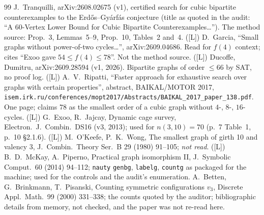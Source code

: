 \documentclass[10pt]{article}
\newcommand{\tier}[1]{\textsf{[#1]}}
\newcommand{\tL}{\tier{L}}
\begin{document}
\begin{thebibliography}{99}\small
{} J.\ Tranquilli, arXiv:2608.02675 (v1), certified search for cubic bipartite counterexamples to the Erd\H{o}s--Gy\'arf\'as conjecture (title as quoted in the audit: ``A 60-Vertex Lower Bound for Cubic Bipartite Counterexamples\dots''). The method source: Prop.~3, Lemmas~5--9, Prop.~10, Tables~2 and~4. (\tL)
 D.\ Garcia, ``Small graphs without power-of-two cycles\dots'', arXiv:2609.04686. Read for $f(4)$ context; cites ``Exoo gave $54\le f(4)\le78$''. Not the method source. (\tL)
 Ducoffe, Dumitru, arXiv:2609.28594 (v1, 2026). Bipartite graphs of order $\le66$ by SAT, no proof log. (\tL)
 A.\ V.\ Ripatti, ``Faster approach for exhaustive search over graphs with certain properties'', abstract, BAIKAL/MOTOR 2017, \texttt{isem.irk.ru/conferences/mopt2017/Abstracts/BAIKAL\_2017\_paper\_138.pdf}. One page; claims $78$ as the smallest order of a cubic graph without $4$-, $8$-, $16$-cycles. (\tL)
 G.\ Exoo, R.\ Jajcay, Dynamic cage survey, Electron.\ J.\ Combin.\ DS16 (v3, 2013); used for $n(3,10)=70$ (p.~7 Table~1, p.~10 \S2.1.6). (\tL)
 M.\ O'Keefe, P.\ K.\ Wong, The smallest graph of girth 10 and valency 3, J.\ Combin.\ Theory Ser.\ B 29 (1980) 91--105; \emph{not read}. (\tL)
 B.\ D.\ McKay, A.\ Piperno, Practical graph isomorphism II, J.\ Symbolic Comput.\ 60 (2014) 94--112; \texttt{nauty} \texttt{genbg}, \texttt{labelg}, \texttt{countg} as packaged for the machine; used for the controls and the audit's enumeration.
 A.\ Betten, G.\ Brinkmann, T.\ Pisanski, Counting symmetric configurations $v_3$, Discrete Appl.\ Math.\ 99 (2000) 331--338; the counts quoted by the auditor; bibliographic details from memory, not checked, and the paper was not re-read here.
\end{thebibliography}
\end{document}
